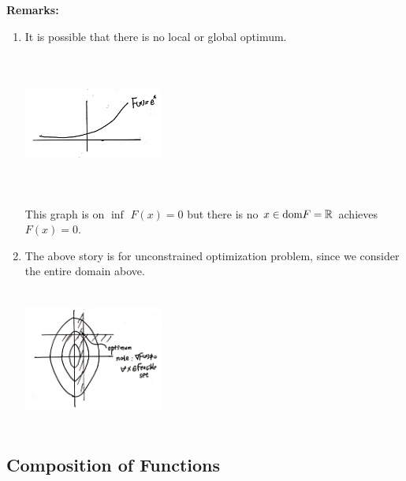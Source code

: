 \textbf{Remarks: }
\begin{enumerate}
	\item It is possible that there is no local or global optimum.
	
	\begin{marginfigure}
	\centering
	\includegraphics[width=1.8in,height=1.8in]{figures/ch08/figure1111_2.png}
	\end{marginfigure}
	
	This graph is on $\inf\,\, F(x) = 0$ but there is no $x\in \text{dom}F = \mathbb{R}$ achieves $F(x) = 0$.
	
	\item The above story is for unconstrained optimization problem, since we consider the entire domain above.
	
	\begin{marginfigure}
	\centering
	\includegraphics[width=1.8in,height=1.8in]{figures/ch08/figure1111_3.png}
	\end{marginfigure}
	
\end{enumerate}






\vspace{0.5cm}
\subsection{Composition of Functions}

